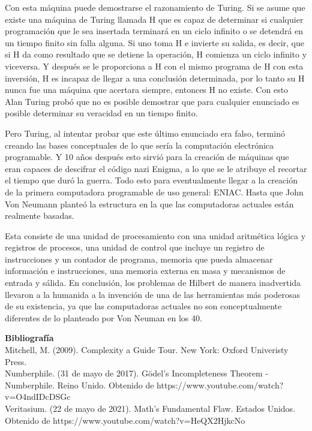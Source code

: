 \documentclass{article}
\begin{document}
    Con esta máquina puede demostrarse el razonamiento de Turing. Si se asume que existe una máquina de Turing llamada H que es capaz de determinar si cualquier
    programación que le sea insertada terminará en un ciclo infinito o se detendrá en un tiempo finito sin falla alguna. Si uno toma H e invierte su salida, es decir, que si H 
    da como resultado que se detiene la operación, H comienza un ciclo infinito y viceversa. Y después se le proporciona a H con el mismo programa de H con esta
    inversión, H es incapaz de llegar a una conclusión determinada, por lo tanto su H nunca fue una máquina que acertara siempre, entonces H no existe. Con esto Alan 
    Turing probó que no es posible demostrar que para cualquier enunciado es posible determinar su veracidad en un tiempo finito.

    Pero Turing, al intentar probar que este último enunciado era falso, terminó creando las bases conceptuales de lo que sería la computación electrónica programable.
    Y 10 años después esto sirvió para la creación de máquinas que eran capaces de descifrar el código nazi Enigma, a lo que se le atribuye el recortar
    el tiempo que duró la guerra. Todo esto para eventualmente llegar a la creación de la primera computadora programable de uso general: ENIAC. Hasta que John Von Neumann
    planteó la estructura en la que las computadoras actuales están realmente basadas.

    Esta consiste de una unidad de procesamiento con una unidad aritmética lógica y registros de procesos, una unidad de control que incluye un registro de 
    instrucciones y un contador de programa, memoria que pueda almacenar información e instrucciones, una memoria externa en masa y mecanismos de entrada y sálida.
    En conclusión, los problemas de Hilbert de manera inadvertida llevaron a la humanida a la invención de una de las herramientas más poderosas de su existencia, ya que
    las computadoras actuales no son conceptualmente diferentes de lo planteado por Von Neuman en los 40.



    \textbf{Bibliografía}\\
    Mitchell, M. (2009). Complexity a Guide Tour. New York: Oxford Univeristy Press.\\
    Numberphile. (31 de mayo de 2017). Gödel's Incompleteness Theorem - Numberphile. Reino Unido. Obtenido de https://www.youtube.com/watch?v=O4ndIDcDSGc\\
    Veritasium. (22 de mayo de 2021). Math's Fundamental Flaw. Estados Unidos. Obtenido de https://www.youtube.com/watch?v=HeQX2HjkcNo
\end{document}
